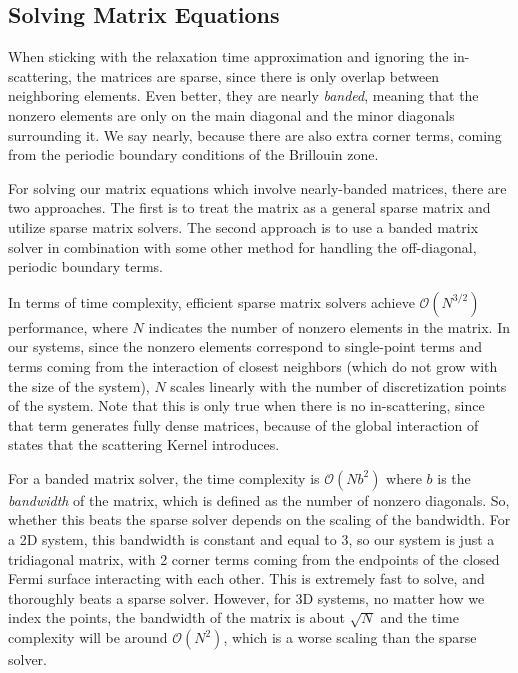 \documentclass[12pt]{article}
\begin{document}
\subsection{Solving Matrix Equations}
When sticking with the relaxation time approximation and ignoring the in-scattering,
the matrices are sparse, since there is only overlap between neighboring elements.
Even better, they are nearly \emph{banded}, meaning that the nonzero elements are only on the main
diagonal and the minor diagonals surrounding it. We say nearly, because there are also extra corner
terms, coming from the periodic boundary conditions of the Brillouin zone.

For solving our matrix equations which involve nearly-banded matrices, there are two approaches.
The first is to treat the matrix as a general sparse matrix and utilize sparse matrix solvers.
The second approach is to use a banded matrix solver in combination with some other method for
handling the off-diagonal, periodic boundary terms.

In terms of time complexity, efficient sparse matrix solvers achieve
$\mathcal{O}(N^{3/2})$ performance, where $N$ indicates the number of nonzero elements in the
matrix. In our systems, since the nonzero elements correspond to single-point terms and terms
coming from the interaction of closest neighbors (which do not grow with the size of the system),
$N$ scales linearly with the number of discretization points of the system. Note that this is only
true when there is no in-scattering, since that term generates fully dense matrices, because of
the global interaction of states that the scattering Kernel introduces.

For a banded matrix solver, the time complexity is $\mathcal{O}(Nb^2)$ where $b$ is the
\emph{bandwidth} of the matrix, which is defined as the number of nonzero diagonals. So, whether
this beats the sparse solver depends on the scaling of the bandwidth. For a 2D system, this
bandwidth is constant and equal to 3, so our system is just a tridiagonal matrix, with 2 corner
terms coming from the endpoints of the closed Fermi surface interacting with each other. This
is extremely fast to solve, and thoroughly beats a sparse solver. However, for 3D systems, no
matter how we index the points, the bandwidth of the matrix is about $\sqrt{N}$ and the time
complexity will be around $\mathcal{O}(N^2)$, which is a worse scaling than the sparse solver.
\end{document}

